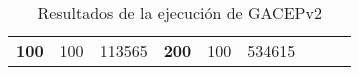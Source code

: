\begin{table}[H]
\begin{tabular}{|ccrccrccc}
\multicolumn{1}{|c|}{\multirow{-39}{*}{\cellcolor[HTML]{FFFFC7}\textbf{100}}} & \multicolumn{1}{c|}{\multirow{-9}{*}{\cellcolor[HTML]{DDFDFF}100}} & \multicolumn{1}{r|}{\cellcolor[HTML]{DAE8FC}113565}    & \multicolumn{1}{c|}{\multirow{-39}{*}{\cellcolor[HTML]{FFFFC7}\textbf{200}}} & \multicolumn{1}{c|}{\multirow{-10}{*}{\cellcolor[HTML]{DDFDFF}100}} & \multicolumn{1}{r|}{\cellcolor[HTML]{DDFDFF}534615}    &                                                                              &                                                                    &                                                        \\ \cline{1-6}
\end{tabular}
\caption{\label{GACEPv2}Resultados de la ejecución de GACEPv2}
\end{table}


